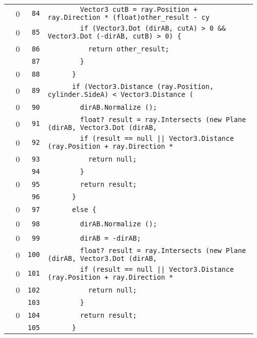 \documentclass[a4paper,10pt]{article}
\begin{document}
\begin{longtable}[l]{lrrl}
\cellcolor{red} & 0 & \verb~84~ & \verb~        Vector3 cutB = ray.Position + ray.Direction * (float)other_result - cy~\\
\cellcolor{red} & 0 & \verb~85~ & \verb~        if (Vector3.Dot (dirAB, cutA) > 0 && Vector3.Dot (-dirAB, cutB) > 0) {~\\
\cellcolor{red} & 0 & \verb~86~ & \verb~          return other_result;~\\
\cellcolor{gray} &  & \verb~87~ & \verb~        }~\\
\cellcolor{red} & 0 & \verb~88~ & \verb~      }~\\
\cellcolor{red} & 0 & \verb~89~ & \verb~      if (Vector3.Distance (ray.Position, cylinder.SideA) < Vector3.Distance (~\\
\cellcolor{red} & 0 & \verb~90~ & \verb~        dirAB.Normalize ();~\\
\cellcolor{red} & 0 & \verb~91~ & \verb~        float? result = ray.Intersects (new Plane (dirAB, Vector3.Dot (dirAB, ~\\
\cellcolor{red} & 0 & \verb~92~ & \verb~        if (result == null || Vector3.Distance (ray.Position + ray.Direction *~\\
\cellcolor{red} & 0 & \verb~93~ & \verb~          return null;~\\
\cellcolor{gray} &  & \verb~94~ & \verb~        }~\\
\cellcolor{red} & 0 & \verb~95~ & \verb~        return result;~\\
\cellcolor{gray} &  & \verb~96~ & \verb~      }~\\
\cellcolor{red} & 0 & \verb~97~ & \verb~      else {~\\
\cellcolor{red} & 0 & \verb~98~ & \verb~        dirAB.Normalize ();~\\
\cellcolor{red} & 0 & \verb~99~ & \verb~        dirAB = -dirAB;~\\
\cellcolor{red} & 0 & \verb~100~ & \verb~        float? result = ray.Intersects (new Plane (dirAB, Vector3.Dot (dirAB, ~\\
\cellcolor{red} & 0 & \verb~101~ & \verb~        if (result == null || Vector3.Distance (ray.Position + ray.Direction *~\\
\cellcolor{red} & 0 & \verb~102~ & \verb~          return null;~\\
\cellcolor{gray} &  & \verb~103~ & \verb~        }~\\
\cellcolor{red} & 0 & \verb~104~ & \verb~        return result;~\\
\cellcolor{gray} &  & \verb~105~ & \verb~      }~\\

\end{longtable}
\end{document}
